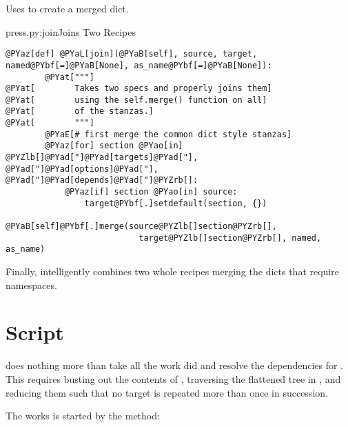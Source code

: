 Uses  to create a merged dict.

\begin{code}{press.py:join}{Joins Two Recipes}
\begin{Verbatim}[commandchars=@\[\]]
    @PYaz[def] @PYaL[join](@PYaB[self], source, target, named@PYbf[=]@PYaB[None], as_name@PYbf[=]@PYaB[None]):
        @PYat["""]
@PYat[        Takes two specs and properly joins them]
@PYat[        using the self.merge() function on all]
@PYat[        of the stanzas.]
@PYat[        """]
        @PYaE[# first merge the common dict style stanzas]
        @PYaz[for] section @PYao[in] @PYZlb[]@PYad["]@PYad[targets]@PYad["], @PYad["]@PYad[options]@PYad["], @PYad["]@PYad[depends]@PYad["]@PYZrb[]:
            @PYaz[if] section @PYao[in] source:
                target@PYbf[.]setdefault(section, {})
                @PYaB[self]@PYbf[.]merge(source@PYZlb[]section@PYZrb[], 
                           target@PYZlb[]section@PYZrb[], named, as_name)
\end{Verbatim}

\end{code}

Finally,  intelligently combines two whole recipes merging the dicts
that require namespaces.




\section{Script}

 does nothing more than take all the work  did and 
resolve the dependencies for .  This requires busting out the
contents of , traversing the flattened tree in
, and reducing them such that no target is repeated more than
once in succession.

The works is started by the  method:


